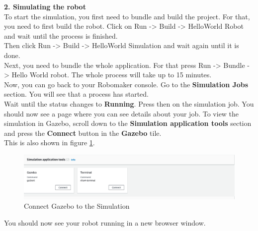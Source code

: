 \documentclass[plainarticle,zihtitle,english,final,hyperref,utf8]{zihpub}
\begin{document}
\textbf{2. Simulating the robot}\\
\newline
To start the simulation, you first need to bundle and build the project. For that, you need to first build the robot. Click on Run -> Build -> HelloWorld Robot and wait until the process is finished.\\
Then click Run -> Build -> HelloWorld Simulation and wait again until it is done.\\
Next, you need to bundle the whole application. For that press Run -> Bundle -> Hello World robot.
The whole process will take up to 15 minutes.\\
\newline
Now, you can go back to your Robomaker console. Go to the \textbf{Simulation Jobs} section. You will see that a process has started. \\
Wait until the status changes to \textbf{Running}. Press then on the simulation job. You should now see a page where you can see details about your job. To view the simulation in Gazebo, scroll down to the \textbf{Simulation application tools} section and press the \textbf{Connect} button in the \textbf{Gazebo} tile. \\
This is also shown in figure \ref{fig:connectGazeboAWS}.
\begin{figure}[h!]
  \begin{center}
    \includegraphics[width=.85\textwidth]{gazebo_connect.png}
    \caption{Connect Gazebo to the Simulation}
    \label{fig:connectGazeboAWS}
  \end{center}
\end{figure}
You should now see your robot running in a new browser window.
\newline
\end{document}

